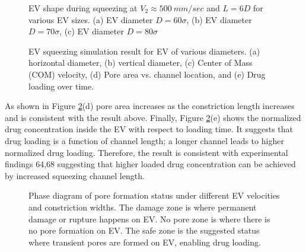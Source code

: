 \begin{figure}[htbp]
  \centering
  
  \vspace{0.5cm}
  \caption{EV shape during squeezing at ${V_2}\approx 500\ mm/sec$ and $L=6D$ for various EV sizes.
  (a) EV diameter $D=60\sigma$, (b) EV diameter $D=70\sigma$, (c) EV diameter $D=80\sigma$}
  \label{fig:11}
\end{figure}

\begin{figure}[htbp]
  \centering
  
  \vspace{0.5cm}
  \caption{EV squeezing simulation result for EV of various diameters. (a)  horizontal diameter, (b) vertical diameter, (c) Center of Mass (COM) velocity, (d) Pore area vs. channel location, and (e) Drug loading over time.}
  \label{fig:12}
\end{figure}

As shown in Figure \ref{fig:12}(d) pore area increases as the constriction length increases and is consistent with the result above. Finally, Figure \ref{fig:12}(e) shows the normalized drug concentration inside the EV with respect to loading time. It suggests that drug loading is a function of channel length; a longer channel leads to higher normalized drug loading. Therefore, the result is consistent with experimental findings 64,68 suggesting that higher loaded drug concentration can be achieved by increased squeezing channel length. 
\\

\begin{figure}[htbp]
  \centering
  
  \vspace{0.5cm}
  \caption{Phase diagram of pore formation status under different EV velocities and constriction widths.  The damage zone is where permanent damage or rupture happens on EV. No pore zone is where there is no pore formation on EV. The safe zone is the suggested status where transient pores are formed on EV, enabling drug loading.}
  \label{fig:13}
\end{figure}

